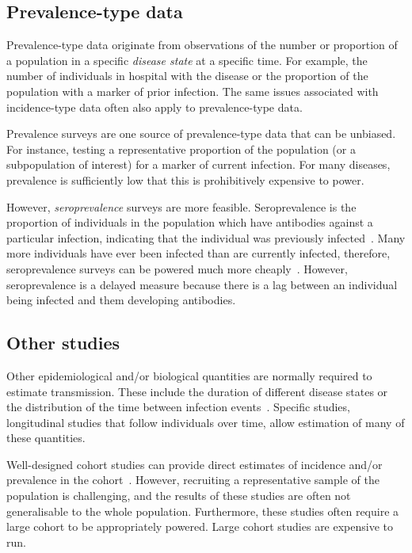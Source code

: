 \documentclass[thesis.tex]{subfiles}
\begin{document}
\subsection{Prevalence-type data}

Prevalence-type data originate from observations of the number or proportion of a population in a specific \emph{disease state} at a specific time.
For example, the number of individuals in hospital with the disease or the proportion of the population with a marker of prior infection.
The same issues associated with incidence-type data often also apply to prevalence-type data.

Prevalence surveys are one source of prevalence-type data that can be unbiased.
For instance, testing a representative proportion of the population (or a subpopulation of interest) for a marker of current infection.
For many diseases, prevalence is sufficiently low that this is prohibitively expensive to power.

However, \emph{seroprevalence} surveys are more feasible.
Seroprevalence is the proportion of individuals in the population which have antibodies against a particular infection, indicating that the individual was previously infected~\autocite{cdcSeroprevalence}.
Many more individuals have ever been infected than are currently infected, therefore, seroprevalence surveys can be powered much more cheaply~\autocite{wuSeroprevSimulation}.
However, seroprevalence is a delayed measure because there is a lag between an individual being infected and them developing antibodies.

\subsection{Other studies}

Other epidemiological and/or biological quantities are normally required to estimate transmission.
These include the duration of different disease states or the distribution of the time between infection events~\autocite{wallingaGI,dankwaStructural}.
Specific studies, \eg longitudinal studies that follow  individuals over time, allow  estimation of many of these quantities.

Well-designed cohort studies can provide direct estimates of incidence and/or prevalence in the cohort~\autocite[chapter 7]{lashModern}.
However, recruiting a representative sample of the population is challenging, and the results of these studies are often not generalisable to the whole population.
Furthermore, these studies often require a large cohort to be appropriately powered.
Large cohort studies are expensive to run.
\end{document}
